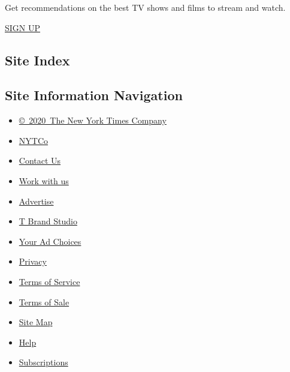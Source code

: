 Get recommendations on the best TV shows and films to stream and watch.

\href{/newsletters/signup/WG}{SIGN UP}

\hypertarget{site-index}{%
\subsection{Site Index}\label{site-index}}

\hypertarget{site-information-navigation}{%
\subsection{Site Information
Navigation}\label{site-information-navigation}}

\begin{itemize}
\tightlist
\item
  \href{https://help.nytimes3xbfgragh.onion/hc/en-us/articles/115014792127-Copyright-notice}{©~2020~The
  New York Times Company}
\end{itemize}

\begin{itemize}
\tightlist
\item
  \href{https://www.nytco.com/}{NYTCo}
\item
  \href{https://help.nytimes3xbfgragh.onion/hc/en-us/articles/115015385887-Contact-Us}{Contact
  Us}
\item
  \href{https://www.nytco.com/careers/}{Work with us}
\item
  \href{https://nytmediakit.com/}{Advertise}
\item
  \href{http://www.tbrandstudio.com/}{T Brand Studio}
\item
  \href{https://www.nytimes3xbfgragh.onion/privacy/cookie-policy\#how-do-i-manage-trackers}{Your
  Ad Choices}
\item
  \href{https://www.nytimes3xbfgragh.onion/privacy}{Privacy}
\item
  \href{https://help.nytimes3xbfgragh.onion/hc/en-us/articles/115014893428-Terms-of-service}{Terms
  of Service}
\item
  \href{https://help.nytimes3xbfgragh.onion/hc/en-us/articles/115014893968-Terms-of-sale}{Terms
  of Sale}
\item
  \href{https://spiderbites.nytimes3xbfgragh.onion}{Site Map}
\item
  \href{https://help.nytimes3xbfgragh.onion/hc/en-us}{Help}
\item
  \href{https://www.nytimes3xbfgragh.onion/subscription?campaignId=37WXW}{Subscriptions}
\end{itemize}
